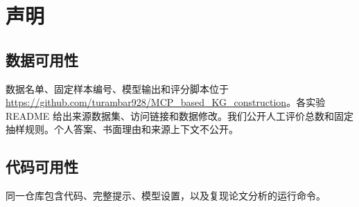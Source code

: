 \section*{声明}

\subsection*{数据可用性}
数据名单、固定样本编号、模型输出和评分脚本位于 \url{https://github.com/turambar928/MCP_based_KG_construction}。各实验 README 给出来源数据集、访问链接和数据修改。我们公开人工评价总数和固定抽样规则。个人答案、书面理由和来源上下文不公开。

\subsection*{代码可用性}
同一仓库包含代码、完整提示、模型设置，以及复现论文分析的运行命令。